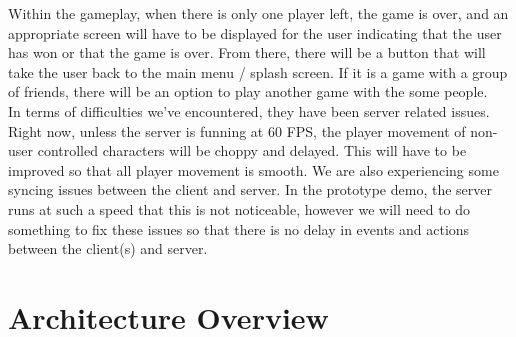 \documentclass[11pt, oneside]{article}   	%
\begin{document}
Within the gameplay, when there is only one player left, the game is over, and an appropriate screen
will have to be displayed for the user indicating that the user has won or that
the game is over. From there, there will be a button that will take the user
back to the main menu / splash screen. If it is a game with a group of friends,
there will be an option to play another game with the some people.\\

In terms of difficulties we've encountered, they have been server related issues.
Right now, unless the server is funning at 60 FPS, the player movement of non-user controlled characters will be choppy and delayed.
This will have to be improved so that all player movement is smooth.
We are also experiencing some syncing issues between the client and server.
In the prototype demo, the server runs at such a speed that this is not noticeable,
however we will need to do something to fix these issues so that there is no delay in events and actions between the client(s) and server.

\clearpage

\section{Architecture Overview}
\end{document}
